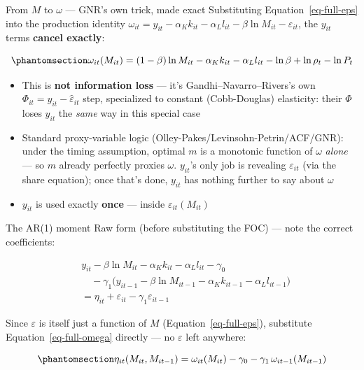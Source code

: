 \documentclass[
  ignorenonframetext,
  aspectratio=169,
]{beamer}
\providecommand{\tightlist}{%
  \setlength{\itemsep}{0pt}\setlength{\parskip}{0pt}}
\begin{document}
\begin{frame}{From \(M\) to \(\omega\) --- GNR's own trick, made exact}
\protect{}\label{from-m-to-omega-gnrs-own-trick-made-exact}
Substituting Equation~\ref{eq-full-eps} into the production identity
\(\omega_{it}=y_{it}-\alpha_Kk_{it}-\alpha_Ll_{it}-\beta\ln M_{it}-\varepsilon_{it}\),
the \(y_{it}\) terms \textbf{cancel exactly}:

\begin{equation}\protect\phantomsection\label{eq-full-omega}{
\omega_{it}(M_{it}) = (1-\beta)\ln M_{it}-\alpha_Kk_{it}-\alpha_Ll_{it}-\ln\beta+\ln\rho_t-\ln P_t
}\end{equation}

\begin{itemize}
\tightlist
\item
  This is \textbf{not information loss} --- it's
  Gandhi--Navarro--Rivers's own
  \(\Phi_{it}=y_{it}-\hat\varepsilon_{it}\) step, specialized to
  constant (Cobb-Douglas) elasticity: their \(\Phi\) loses \(y_{it}\)
  the \emph{same} way in this special case
\item
  Standard proxy-variable logic (Olley-Pakes/Levinsohn-Petrin/ACF/GNR):
  under the timing assumption, optimal \(m\) is a monotonic function of
  \(\omega\) \emph{alone} --- so \(m\) already perfectly proxies
  \(\omega\). \(y_{it}\)'s only job is revealing \(\varepsilon_{it}\)
  (via the share equation); once that's done, \(y_{it}\) has nothing
  further to say about \(\omega\)
\item
  \(y_{it}\) is used exactly \textbf{once} --- inside
  \(\varepsilon_{it}(M_{it})\)
\end{itemize}
\end{frame}

\begin{frame}{The AR(1) moment}
\protect{}\label{the-ar1-moment}
Raw form (before substituting the FOC) --- note the correct
coefficients:

\[
\begin{aligned}
&y_{it}-\beta\ln M_{it}-\alpha_Kk_{it}-\alpha_Ll_{it}-\gamma_0\\
&\quad-\gamma_1\big(y_{it-1}-\beta\ln M_{it-1}-\alpha_Kk_{it-1}-\alpha_Ll_{it-1}\big)\\
&= \eta_{it}+\varepsilon_{it}-\gamma_1\varepsilon_{it-1}
\end{aligned}
\]

Since \(\varepsilon\) is itself just a function of \(M\)
(Equation~\ref{eq-full-eps}), substitute Equation~\ref{eq-full-omega}
directly --- no \(\varepsilon\) left anywhere:

\begin{equation}\protect\phantomsection\label{eq-full-eta}{
\eta_{it}(M_{it},M_{it-1}) = \omega_{it}(M_{it})-\gamma_0-\gamma_1\,\omega_{it-1}(M_{it-1})
}\end{equation}
\end{frame}
\end{document}
